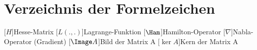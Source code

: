 \chapter*{Verzeichnis der Formelzeichen}
\begin{acronym}[LabVIEW] %
	[\ensuremath{H}]{Hesse-Matrix}
	[\ensuremath{L(.,.)}]{Lagrange-Funktion}
	[\ensuremath{\Ham}]{Hamilton-Operator}
	[\ensuremath{\nabla}]{Nabla-Operator (Gradient)}
	[\ensuremath{\Image A}]{Bild der Matrix A}
	[\ensuremath{\ker A}]{Kern der Matrix A}
\end{acronym}